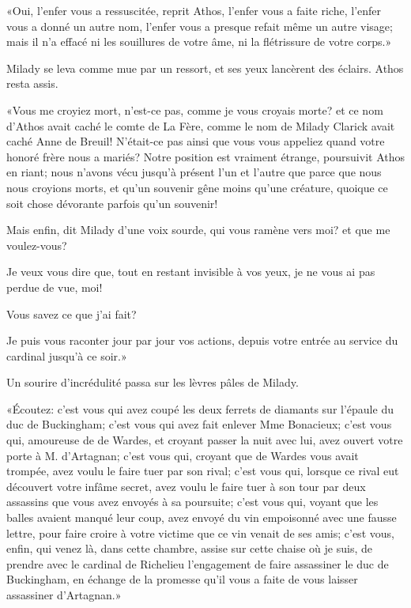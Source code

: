«Oui, l'enfer vous a ressuscitée, reprit Athos, l'enfer vous a faite riche, l'enfer vous a donné un autre nom, l'enfer vous a presque refait même un autre visage; mais il n'a effacé ni les souillures de votre âme, ni la flétrissure de votre corps.» 

Milady se leva comme mue par un ressort, et ses yeux lancèrent des éclairs. Athos resta assis. 

«Vous me croyiez mort, n'est-ce pas, comme je vous croyais morte? et ce nom d'Athos avait caché le comte de La Fère, comme le nom de Milady Clarick avait caché Anne de Breuil! N'était-ce pas ainsi que vous vous appeliez quand votre honoré frère nous a mariés? Notre position est vraiment étrange, poursuivit Athos en riant; nous n'avons vécu jusqu'à présent l'un et l'autre que parce que nous nous croyions morts, et qu'un souvenir gêne moins qu'une créature, quoique ce soit chose dévorante parfois qu'un souvenir! 

\speak  Mais enfin, dit Milady d'une voix sourde, qui vous ramène vers moi? et que me voulez-vous? 

\speak  Je veux vous dire que, tout en restant invisible à vos yeux, je ne vous ai pas perdue de vue, moi! 

\speak  Vous savez ce que j'ai fait? 

\speak  Je puis vous raconter jour par jour vos actions, depuis votre entrée au service du cardinal jusqu'à ce soir.» 

Un sourire d'incrédulité passa sur les lèvres pâles de Milady. 

«Écoutez: c'est vous qui avez coupé les deux ferrets de diamants sur l'épaule du duc de Buckingham; c'est vous qui avez fait enlever Mme Bonacieux; c'est vous qui, amoureuse de de Wardes, et croyant passer la nuit avec lui, avez ouvert votre porte à M. d'Artagnan; c'est vous qui, croyant que de Wardes vous avait trompée, avez voulu le faire tuer par son rival; c'est vous qui, lorsque ce rival eut découvert votre infâme secret, avez voulu le faire tuer à son tour par deux assassins que vous avez envoyés à sa poursuite; c'est vous qui, voyant que les balles avaient manqué leur coup, avez envoyé du vin empoisonné avec une fausse lettre, pour faire croire à votre victime que ce vin venait de ses amis; c'est vous, enfin, qui venez là, dans cette chambre, assise sur cette chaise où je suis, de prendre avec le cardinal de Richelieu l'engagement de faire assassiner le duc de Buckingham, en échange de la promesse qu'il vous a faite de vous laisser assassiner d'Artagnan.» 

